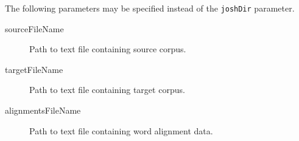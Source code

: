 \documentclass{pbml}
\begin{document}
The following parameters may be specified instead of the {\tt joshDir} parameter.
	
\begin{description}
	\item[sourceFileName] Path to text file containing source corpus. %

	\item[targetFileName] Path to text file containing target corpus. 


	\item[alignmentsFileName]  Path to text file containing word alignment data. 


	
\end{description}
\end{document}
